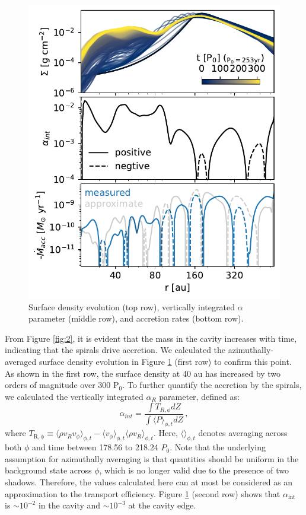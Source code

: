 \documentclass[twocolumn,tighten]{aastex631}
\begin{document}
\begin{figure}
\includegraphics[width=\linewidth]{Figure2b.pdf}
    \caption{Surface density evolution (top row), vertically integrated $\alpha$ parameter (middle row), and accretion rates (bottom row).}
    \label{fig:2b}
\end{figure}
From Figure \ref{fig:2}, it is evident that the mass in the cavity increases with time, indicating that the spirals drive accretion. We calculated the azimuthally-averaged surface density evolution in Figure \ref{fig:2b} (first row) to confirm this point. As shown in the first row, the surface density at 40 au has increased by two orders of magnitude over 300 P$_0$. To further quantify the accretion by the spirals, we calculated the vertically integrated $\alpha_{R}$ parameter, defined as:
\begin{equation}
\alpha_{int}=\frac{\int T_{R,\phi}dZ}{\int \langle P \rangle_{\phi,t} dZ}\,,\label{eq:alphaint}
\end{equation}
where $T_\mathrm{R, \phi} \equiv \langle \rho v_R v_\phi \rangle_{\phi,t} - \langle v_\phi \rangle_{\phi,t} \langle \rho v_R \rangle_{\phi,t}$. Here, $\langle \rangle_{\phi,t}$ denotes averaging across both $\phi$ and time between 178.56 to 218.24 $P_0$. Note that the underlying assumption for azimuthally averaging is that quantities should be uniform in the background state across $\phi$, which is no longer valid due to the presence of two shadows. Therefore, the values calculated here can at most be considered as an approximation to the transport efficiency. Figure \ref{fig:2b} (second row) shows that $\alpha_{\text{int}}$ is $\sim 10^{-2}$ in the cavity and $\sim 10^{-3}$ at the cavity edge.
\end{document}
